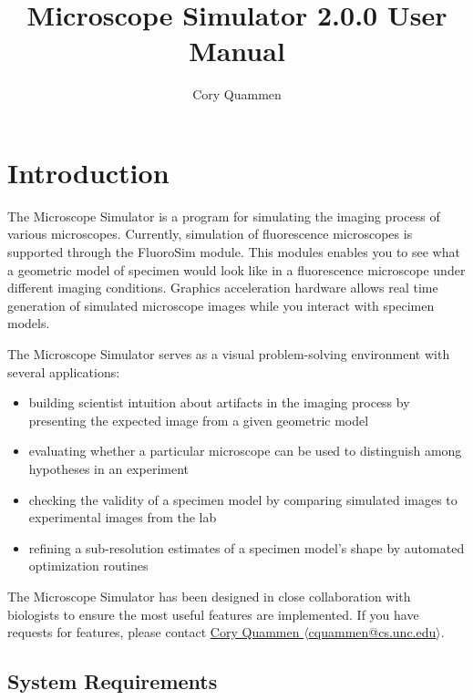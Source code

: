 \documentclass[11pt]{article}
\title{Microscope Simulator 2.0.0 User Manual}
\author{Cory Quammen}
\begin{document}
\maketitle

\section{Introduction}

The Microscope Simulator is a program for simulating the imaging process of various microscopes. Currently, simulation of fluorescence microscopes is supported through the FluoroSim module. This modules enables you to see what a geometric model of specimen would look like in a fluorescence microscope under different imaging conditions. Graphics acceleration hardware allows real time generation of simulated microscope images while you interact with specimen models.

The Microscope Simulator serves as a visual problem-solving environment with several applications:

\begin{itemize}

\item building scientist intuition about artifacts in the imaging process by presenting the expected image from a given geometric model

\item evaluating whether a particular microscope can be used to distinguish among hypotheses in an experiment

\item checking the validity of a specimen model by comparing simulated images to experimental images from the lab

\item refining a sub-resolution estimates of a specimen model's shape by automated optimization routines

\end{itemize}

The Microscope Simulator has been designed in close collaboration with biologists to ensure the most useful features are implemented. If you have requests for features, please contact  \href{mailto:cquammen@cs.unc.edu}{Cory Quammen $\langle$cquammen@cs.unc.edu$\rangle$}.


\subsection{System Requirements}
\end{document}
